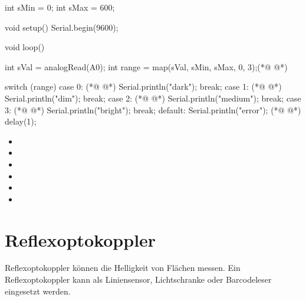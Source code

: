 \begin{multicols}{2}
\null\vfill 
\begin{arduinoCode}{}{}
int sMin = 0;      
int sMax = 600;    

void setup() {
  Serial.begin(9600);
}

void loop() {
  int sVal = analogRead(A0);
  int range = map(sVal, sMin, sMax, 0, 3);(*@  @*)
   
  switch (range) {
    case 0:      (*@  @*)
      Serial.println("dark");
      break;
    case 1:      (*@  @*)
      Serial.println("dim");
      break;
    case 2:     (*@  @*)
      Serial.println("medium");
      break;
    case 3:     (*@  @*)
      Serial.println("bright");
      break;
    default:
       Serial.println("error");  (*@  @*)
  }
  delay(1);  
}
\end{arduinoCode}
\vfill\null 
\columnbreak
\null\vfill\vfill
\begin{itemize}
  \item[] 
  \itemsep55pt
  \item[] 
  \itemsep20pt
  \item[] 
  \item[] 
  \item[] 
  \item[] 
\end{itemize}
\vfill \null

\end{multicols}


\section{Reflexoptokoppler}
\label{sec:reflex}
Reflexoptokoppler können die Helligkeit von Flächen messen. Ein Reflexoptokoppler kann als Liniensensor, Lichtschranke oder Barcodeleser eingesetzt werden.

